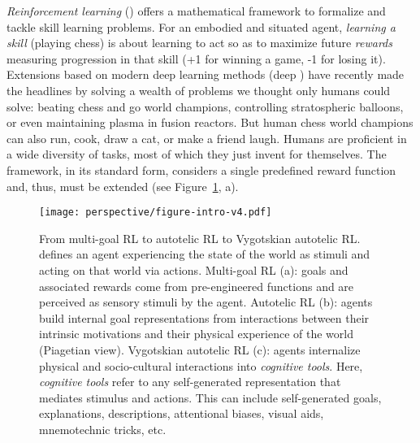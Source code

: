 \textit{Reinforcement learning} (\rl) offers a mathematical framework to formalize and tackle skill learning problems. For an embodied and situated \rl agent, \textit{learning a skill} (\eg playing chess) is about learning to act so as to maximize future \textit{rewards} measuring progression in that skill (\eg +1 for winning a game, -1 for losing it).\cite{sutton_introduction_1998} Extensions based on modern deep learning methods (deep \rl) have recently made the headlines by solving a wealth of problems we thought only humans could solve: beating chess and go world champions,\cite{silver2016mastering} controlling stratospheric balloons,\cite{bellemare2020autonomous} or even maintaining plasma in fusion reactors.\cite{degrave2022magnetic} But human chess world champions can also run, cook, draw a cat, or make a friend laugh. Humans are proficient in a wide diversity of tasks, most of which they just invent for themselves. The \rl framework, in its standard form, considers a single predefined reward function and, thus, must be extended (see Figure~\ref{fig:rl_arl_varl}, a).

\vspace{.4cm}

\begin{figure}[!ht]
    \centering
    \captionsetup{width=.85\linewidth}
    \texttt{[image: perspective/figure-intro-v4.pdf]}
    \caption{\small From multi-goal RL to autotelic RL to Vygotskian autotelic RL. \rl defines an agent experiencing the state of the world as stimuli and acting on that world via actions. Multi-goal RL (a): goals and associated rewards come from pre-engineered functions and are perceived as sensory stimuli by the agent. Autotelic RL (b): agents build internal goal representations from interactions between their intrinsic motivations and their physical experience of the world (Piagetian view). Vygotskian autotelic RL (c): agents internalize physical and socio-cultural interactions into \textit{cognitive tools}. Here, \textit{cognitive tools} refer to any self-generated representation that mediates stimulus and actions. This can include self-generated goals, explanations, descriptions, attentional biases, visual aids, mnemotechnic tricks, etc. }
    \label{fig:rl_arl_varl}
\end{figure}

\vspace{.4cm}


